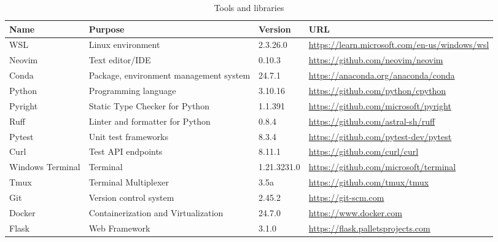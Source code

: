 \begin{sidewaystable}[htbp]
  \caption{Tools and libraries}\label{tab:tools}
  \raggedleft
  \begin{tabular}{|l|l|l|l|}
    \hline
    Name             & Purpose                                & Version     & URL                                                 \\ \hline
    WSL              & Linux environment                      & 2.3.26.0    & \url{https://learn.microsoft.com/en-us/windows/wsl} \\ \hline
    Neovim           & Text editor/IDE                        & 0.10.3      & \url{https://github.com/neovim/neovim}              \\ \hline
    Conda            & Package, environment management system & 24.7.1      & \url{https://anaconda.org/anaconda/conda}           \\ \hline
    Python           & Programming language                   & 3.10.16     & \url{https://github.com/python/cpython}             \\ \hline
    Pyright          & Static Type Checker for Python         & 1.1.391     & \url{https://github.com/microsoft/pyright}          \\ \hline
    Ruff             & Linter and formatter for Python        & 0.8.4       & \url{https://github.com/astral-sh/ruff}             \\ \hline
    Pytest           & Unit test frameworks                   & 8.3.4       & \url{https://github.com/pytest-dev/pytest}          \\ \hline
    Curl             & Test API endpoints                     & 8.11.1      & \url{https://github.com/curl/curl}                  \\ \hline
    Windows Terminal & Terminal                               & 1.21.3231.0 & \url{https://github.com/microsoft/terminal}         \\ \hline
    Tmux             & Terminal Multiplexer                   & 3.5a        & \url{https://github.com/tmux/tmux}                  \\ \hline
    Git              & Version control system                 & 2.45.2      & \url{https://git-scm.com}                           \\ \hline
    Docker           & Containerization and Virtualization    & 24.7.0      & \url{https://www.docker.com}                        \\ \hline
    Flask            & Web Framework                          & 3.1.0       & \url{https://flask.palletsprojects.com}             \\ \hline

\end{tabular}
\end{sidewaystable}
